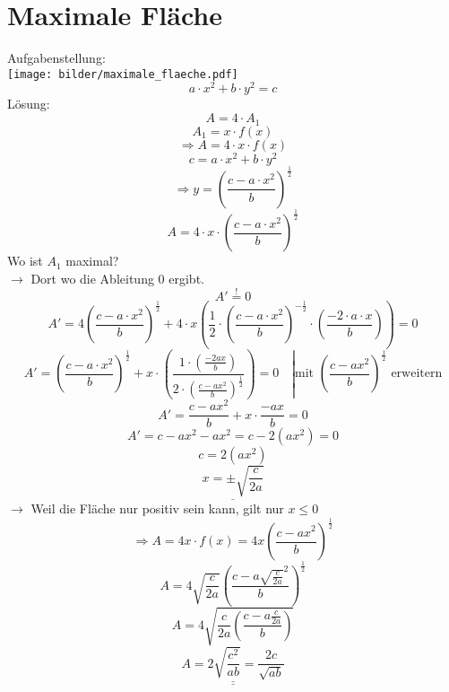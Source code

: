 \section{Maximale Fläche}
Aufgabenstellung: \\
\texttt{[image: bilder/maximale\_flaeche.pdf]}
\[a \cdot x^2 + b \cdot y^2 = c\]
Lösung:
\[A = 4 \cdot A_1\]
\[A_1 = x \cdot f(x)\]
\[\Rightarrow A = 4 \cdot x \cdot f(x)\]
\[c = a \cdot x^2 + b \cdot y^2\]
\[\Rightarrow y = \left( \frac{c - a \cdot x^2}{b} \right)^{\frac{1}{2}}\]
\[A = 4 \cdot x \cdot \left( \frac{c - a \cdot x^2}{b} \right)^{\frac{1}{2}}\]
Wo ist $A_1$ maximal? \\
$\rightarrow$ Dort wo die Ableitung $0$ ergibt. 
\[A' \stackrel{!}{=} 0\]
\[A' = 4 \left(\frac{c - a \cdot x^2}{b}\right)^\frac{1}{2} + 4 \cdot x \left(\frac{1}{2} \cdot \left(\frac{c - a \cdot x^2}{b}\right)^{-\frac{1}{2}} \cdot \left(\frac{-2 \cdot a \cdot x}{b}\right)\right) = 0\]
\[A' = \left(\frac{c - a \cdot x^2}{b}\right)^{\frac{1}{2}} + x \cdot \left(\frac{1 \cdot \left(\frac{-2ax}{b}\right)}{2 \cdot \left(\frac{c - ax^2}{b}\right)^{\frac{1}{2}}}\right) = 0\quad \left|\text{mit }\left(\frac{c - ax^2}{b}\right)^{\frac{1}{2}} \right.\text{ erweitern}\]
\[A' = \frac{c - ax^2}{b} + x \cdot \frac{-ax}{b} = 0\]
\[A' = c - ax^2 - ax^2 = c - 2 \left(ax^2\right) = 0\]
\[c = 2 \left(ax^2\right)\]
\[\underline{x = \pm\sqrt{\frac{c}{2a}}}\]
$\rightarrow$ Weil die Fläche nur positiv sein kann, gilt nur $x \leq 0$
\[\Rightarrow A = 4 x \cdot f(x) = 4 x \left(\frac{c - ax^2}{b}\right)^{\frac{1}{2}}\]
\[A = 4 \sqrt{\frac{c}{2a}} \left(\frac{c - a \sqrt{\frac{c}{2a}}^2}{b}\right)^{\frac{1}{2}}\]
\[A = 4 \sqrt{\frac{c}{2a} \left(\frac{c - a \frac{c}{2a}}{b}\right)}\]
\[\underline{\underline{A = 2 \sqrt{\frac{c^2}{ab} } = \frac{2c}{\sqrt{ab}}}}\]

